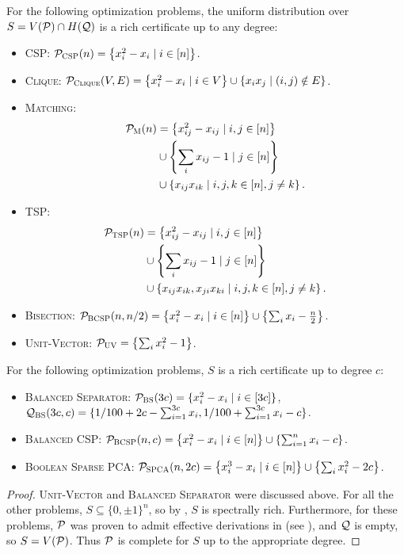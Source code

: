 \begin{corollary}\label{cor:examples}
For the following optimization problems, the uniform distribution over $S = V(\cP) \cap H(\cQ)$ is a rich certificate up to any degree:
\begin{itemize}
\item \textsc{CSP}: $\pcsp(n) = \csp$. 
\item \textsc{Clique}: $\pclique(V,E) = \clique$.
\item \textsc{Matching}: 
\begin{align*}
\pmatch(n) &= \alignmatching.
\end{align*}
\item \textsc{TSP}:
\begin{align*}
\ptsp(n) &= \aligntsp.
\end{align*}
\item \textsc{Bisection}: $\pbcsp(n,n/2) = \bisec$.
\item \textsc{Unit-Vector}: $\cP_{\textsc{UV}} = \left\{\sum_i x_i^2 - 1\right\}$.
\end{itemize}
For the following optimization problems, $S$ is a rich certificate up to degree $c$:
\begin{itemize}
\item \textsc{Balanced Separator}: $\cP_{\textsc{BS}}(3c) = \{x_i^2 - x_i \mid i \in [3c]\}$, $\cQ_{\textsc{BS}}(3c,c) = \{1/100 + 2c - \sum_{i=1}^{3c} x_i, 1/100 + \sum_{i=1}^{3c} x_i - c\}$.
\item \textsc{Balanced CSP}: $\pbcsp(n,c) = \bcsp{n}{c}$.
\item \textsc{Boolean Sparse PCA}: $\pspca(n,2c) = \bspca{n}{2c}$.
\end{itemize}
\end{corollary}
\begin{proof}
\textsc{Unit-Vector} and \textsc{Balanced Separator} were discussed above. For all the other problems, $S \subseteq \{0,\pm 1\}^n$, so by , $S$ is spectrally rich. Furthermore, for these problems, $\cP$ was proven to admit effective derivations in  (see ), and $\cQ$ is empty, so $S = V(\cP)$. Thus $\cP$ is complete for $S$ up to the appropriate degree. 
\end{proof}

